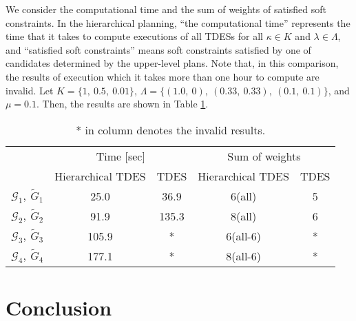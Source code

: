 \documentclass[journal,twoside,web]{IEEEtran}
\begin{document}
We consider the computational time and the sum of weights of satisfied soft constraints.
In the hierarchical planning, ``the computational time'' represents the time that it takes to compute executions of all TDESs for all $\kappa\in K$ and $\lambda\in \Lambda$, and ``satisfied soft constraints'' means soft constraints satisfied by one of candidates determined by the upper-level plans.
Note that, in this comparison, the results of execution which it takes more than one hour to compute are invalid.
Let $K=\{1,~0.5,~0.01\}$, $\Lambda=\{(1.0,~0),~(0.33,~0.33),~(0.1,~0.1)\}$, and $\mu=0.1$. 
Then, the results are shown in Table \ref{tab:comp}.
\begin{table}[h]
\caption{* in column denotes the invalid results.}\label{tab:comp}
\centering
\begin{tabular}{c||c|c|c|c}
&\multicolumn{2}{c|}{Time [sec]}  &\multicolumn{2}{c}{Sum of weights} \\\cline{2-5}
&Hierarchical TDES& TDES&Hierarchical TDES& TDES \\
\hline
$\mathcal{G}_1,~\tilde{G}_1$&25.0   & 36.9 &  6(all) &  5\\
$\mathcal{G}_2,~\tilde{G}_2$& 91.9  &  135.3&  8(all)  & 6\\
$\mathcal{G}_3,~\tilde{G}_3$& 105.9  & * &  6(all-6)  &* \\
$\mathcal{G}_4,~\tilde{G}_4$& 177.1  & * &  8(all-6)  & *\\
\end{tabular}
\end{table}

%
%
\section{Conclusion}
%
\end{document}
